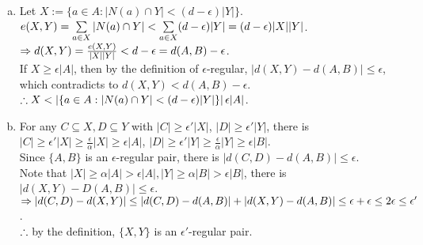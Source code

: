 \setcounter{pr}{0}

\begin{pr}$ $
\begin{enumerate}[(a)]
\item Let $X:=\{a\in A:|N(a)\cap Y|<(d-\epsilon)|Y|\}$.\\
$e(X, Y)=\sum\limits_{a\in X}|N(a)\cap Y|<\sum\limits_{a\in X}(d-\epsilon)|Y|=(d-\epsilon)|X||Y|$.\\
$\Rightarrow d(X, Y)=\frac{e(X, Y)}{|X||Y|}<d-\epsilon=d(A, B)-\epsilon$.\\
If $X\geq\epsilon|A|$, then by the definition of $\epsilon$-regular, $|d(X, Y)-d(A, B)|\leq\epsilon$, which contradicts to $d(X, Y)<d(A, B)-\epsilon$.\\
$\therefore X<\left|\{a\in A:|N(a)\cap Y|<(d-\epsilon)|Y|\}\right|\epsilon|A|$.
\item For any $C\subseteq X, D\subseteq Y$ with $|C|\geq\epsilon'|X|$, $|D|\geq\epsilon'|Y|$, there is $|C|\geq\epsilon'|X|\geq\frac\epsilon\alpha|X|\geq\epsilon|A|$, $|D|\geq\epsilon'|Y|\geq\frac\epsilon\alpha|Y|\geq\epsilon|B|$.\\
Since $\{A, B\}$ is an $\epsilon$-regular pair, there is $|d(C, D)-d(A, B)|\leq\epsilon$.\\
Note that $|X|\geq\alpha|A|>\epsilon|A|, |Y|\geq\alpha|B|>\epsilon|B|$, there is $|d(X, Y)-D(A, B)|\leq\epsilon$.\\
$\Rightarrow|d(C, D)-d(X, Y)|\leq|d(C, D)-d(A, B)|+|d(X, Y)-d(A, B)|\leq\epsilon+\epsilon\leq2\epsilon\leq\epsilon'$.\\
$\therefore$ by the definition, $\{X, Y\}$ is an $\epsilon'$-regular pair.
\end{enumerate}
\end{pr}
